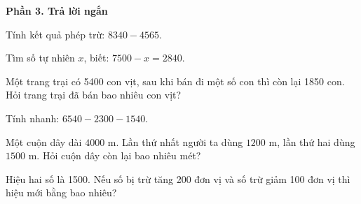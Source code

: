 \textbf{Phần 3. Trả lời ngắn}

\begin{ex} %
Tính kết quả phép trừ: $8340 - 4565$.
\end{ex}

\begin{ex} %
Tìm số tự nhiên $x$, biết: $7500 - x = 2840$.
\end{ex}

\begin{ex} %
Một trang trại có 5400 con vịt, sau khi bán đi một số con thì còn lại 1850 con. Hỏi trang trại đã bán bao nhiêu con vịt?
\end{ex}

\begin{ex} %
Tính nhanh: $6540 - 2300 - 1540$.
\end{ex}

\begin{ex} %
Một cuộn dây dài $4000\text{ m}$. Lần thứ nhất người ta dùng $1200\text{ m}$, lần thứ hai dùng $1500\text{ m}$. Hỏi cuộn dây còn lại bao nhiêu mét?
\end{ex}

\begin{ex} %
Hiệu hai số là 1500. Nếu số bị trừ tăng 200 đơn vị và số trừ giảm 100 đơn vị thì hiệu mới bằng bao nhiêu?
\end{ex}
